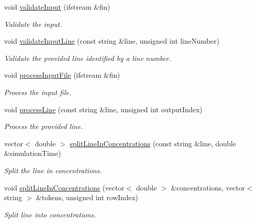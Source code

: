 \begin{DoxyCompactItemize}
void \hyperlink{classmultiscale_1_1video_1_1RectangularCsvToInputFilesConverter_ad8be93ca4e4efbc6394de6f9d688df51}{validate\-Input} (ifstream \&fin)
\begin{DoxyCompactList}\small\item\em Validate the input. \end{DoxyCompactList}\item 
void \hyperlink{classmultiscale_1_1video_1_1RectangularCsvToInputFilesConverter_a876c93163765bcae5d0b12047df99d58}{validate\-Input\-Line} (const string \&line, unsigned int line\-Number)
\begin{DoxyCompactList}\small\item\em Validate the provided line identified by a line number. \end{DoxyCompactList}\item 
void \hyperlink{classmultiscale_1_1video_1_1RectangularCsvToInputFilesConverter_acf389f7384f0646e922df99c27768a6f}{process\-Input\-File} (ifstream \&fin)
\begin{DoxyCompactList}\small\item\em Process the input file. \end{DoxyCompactList}\item 
void \hyperlink{classmultiscale_1_1video_1_1RectangularCsvToInputFilesConverter_a56fb3e2a0f7a24a73c24e3be8888774d}{process\-Line} (const string \&line, unsigned int output\-Index)
\begin{DoxyCompactList}\small\item\em Process the provided line. \end{DoxyCompactList}\item 
vector$<$ double $>$ \hyperlink{classmultiscale_1_1video_1_1RectangularCsvToInputFilesConverter_ab297918325583ff85c8740fa9c5661f6}{split\-Line\-In\-Concentrations} (const string \&line, double \&simulation\-Time)
\begin{DoxyCompactList}\small\item\em Split the line in concentrations. \end{DoxyCompactList}\item 
void \hyperlink{classmultiscale_1_1video_1_1RectangularCsvToInputFilesConverter_a6cfe59bda4fbe1944199b6d27f8ee8b0}{split\-Line\-In\-Concentrations} (vector$<$ double $>$ \&concentrations, vector$<$ string $>$ \&tokens, unsigned int row\-Index)
\begin{DoxyCompactList}\small\item\em Split line into concentrations. \end{DoxyCompactList}\item 

\end{DoxyCompactItemize}
